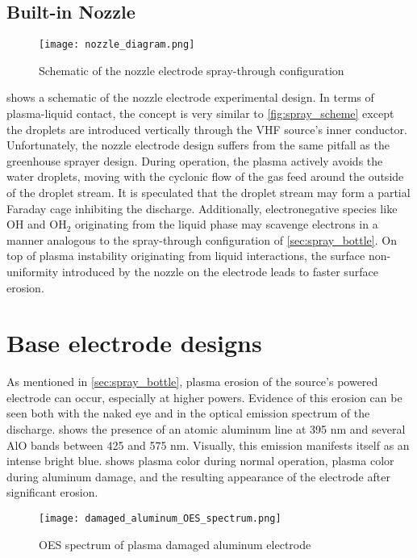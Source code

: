 \subsection{Built-in Nozzle}

\begin{figure}[htbp]
  \centering
  \texttt{[image: nozzle\_diagram.png]}
  \caption{Schematic of the nozzle electrode spray-through configuration}
  \label{fig:nozzle}
\end{figure}

 shows a schematic of the nozzle electrode experimental design. In terms of plasma-liquid contact, the concept is very similar to \cref{fig:spray_scheme} except the droplets are introduced vertically through the VHF source's inner conductor. Unfortunately, the nozzle electrode design suffers from the same pitfall as the greenhouse sprayer design. During operation, the plasma actively avoids the water droplets, moving with the cyclonic flow of the gas feed around the outside of the droplet stream. It is speculated that the droplet stream may form a partial Faraday cage inhibiting the discharge. Additionally, electronegative species like OH and OH$_2$ originating from the liquid phase may scavenge electrons in a manner analogous to the spray-through configuration of \cref{sec:spray_bottle}. On top of plasma instability originating from liquid interactions, the surface non-uniformity introduced by the nozzle on the electrode leads to faster surface erosion.

\section{Base electrode designs}
\label{sec:electrodes}

As mentioned in \cref{sec:spray_bottle}, plasma erosion of the source's powered electrode can occur, especially at higher powers. Evidence of this erosion can be seen both with the naked eye and in the optical emission spectrum of the discharge.  shows the presence of an atomic aluminum line at 395 nm and several AlO bands between 425 and 575 nm. Visually, this emission manifests itself as an intense bright blue.  shows plasma color during normal operation, plasma color during aluminum damage, and the resulting appearance of the electrode after significant erosion.

\begin{figure}[htbp]
  \centering
  \texttt{[image: damaged\_aluminum\_OES\_spectrum.png]}
  \caption{OES spectrum of plasma damaged aluminum electrode}
  \label{fig:OES_alum_damage}
\end{figure}

